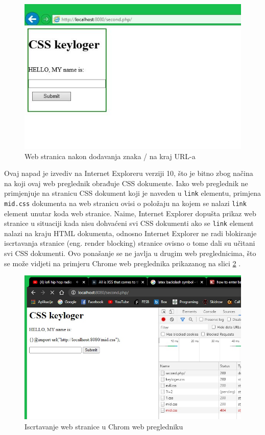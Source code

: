 \documentclass[12pt, oneside, onecolumn]{book}
\begin{document}
{\begin{figure}[H]
	\begin{center}
		\includegraphics[width=\textwidth]{css_slh.jpg}
		\caption{Web stranica nakon dodavanja znaka / na kraj URL-a} \label{fig:css_slh}
	\end{center}
\end{figure}

Ovaj napad je izvediv na Internet Exploreru verziji 10, što je bitno zbog načina na koji ovaj web preglednik obrađuje CSS dokumente. Iako web preglednik ne primjenjuje na stranicu CSS dokument koji je naveden u \texttt{link} elementu, primjena \texttt{mid.css} dokumenta na web stranicu ovisi o položaju na kojem se nalazi \texttt{link} element unutar koda web stranice. Naime, Internet Explorer dopušta prikaz web stranice u situaciji kada nisu dohvaćeni svi CSS dokumenti ako se \texttt{link} element nalazi na kraju HTML dokumenta, odnosno Internet Explorer ne radi blokiranje iscrtavanja stranice (eng. render blocking) stranice ovisno o tome dali su učitani svi CSS dokumenti. Ovo ponašanje se ne javlja u drugim web preglednicima, što se može vidjeti na primjeru Chrome web preglednika prikazanog na slici \ref{fig:css_pend} \cite{cssnapad2}.

\begin{figure}[H]
	\begin{center}
		\includegraphics[width=\textwidth]{css_pend.jpg}
		\caption{Iscrtavanje web stranice u Chrom web pregledniku} \label{fig:css_pend}
	\end{center}
\end{figure}

}
\end{document}
